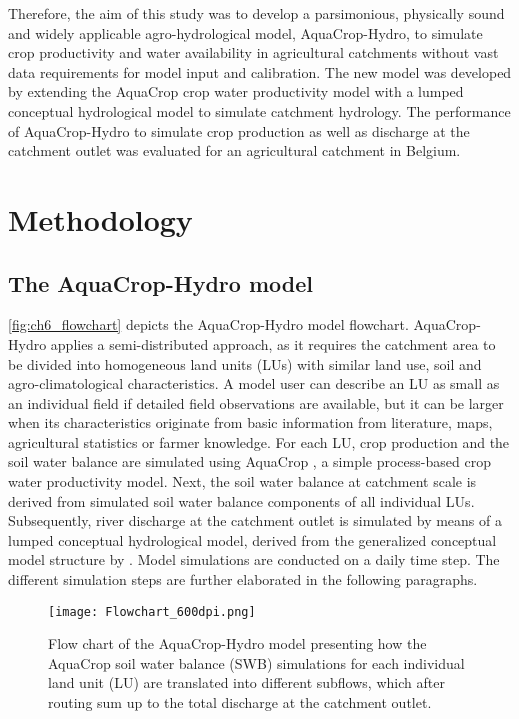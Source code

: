 Therefore, the aim of this study was to develop a parsimonious, physically sound and widely applicable agro-hydrological model, AquaCrop-Hydro, to simulate crop productivity and water availability in agricultural catchments without vast data requirements for model input and calibration. The new model was developed by extending the AquaCrop crop water productivity model \parencite{hsiao2009,steduto2009,raes2009,vanuytrecht2014a} with a lumped conceptual hydrological model to simulate catchment hydrology. The performance of AquaCrop-Hydro to simulate crop production as well as discharge at the catchment outlet was evaluated for an agricultural catchment in Belgium. 

\section{Methodology} 
\subsection{The AquaCrop-Hydro model} 
\autoref{fig:ch6_flowchart} depicts the AquaCrop-Hydro model flowchart. AquaCrop-Hydro applies a semi-distributed approach, as it requires the catchment area to be divided into homogeneous land units (LUs) with similar land use, soil and agro-climatological characteristics. A model user can describe an LU as small as an individual field if detailed field observations are available, but it can be larger when its characteristics originate from basic information from literature, maps, agricultural statistics or farmer knowledge. For each LU, crop production and the soil water balance are simulated using AquaCrop \parencite{fao2015}, a simple process-based crop water productivity model. Next, the soil water balance at catchment scale is derived from simulated soil water balance components of all individual LUs. Subsequently, river discharge at the catchment outlet is simulated by means of a lumped conceptual hydrological model, derived from the generalized conceptual model structure by \textcite{willems2014a}. Model simulations are conducted on a daily time step. The different simulation steps are further elaborated in the following paragraphs.

 \begin{figure}[tbhp]
	\centering
		\texttt{[image: Flowchart\_600dpi.png]}
	\caption{Flow chart of the AquaCrop-Hydro model presenting how the AquaCrop soil water balance (SWB) simulations for each individual land unit (LU) are translated into different subflows, which after routing sum up to the total discharge at the catchment outlet.}
	\label{fig:ch6_flowchart}
\end{figure}


